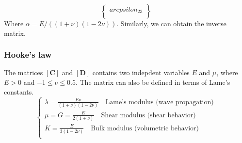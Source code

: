 \documentclass[notes]{beamer}
\begin{document}
\begin{frame}
\begin{equation*}
\begin{Bmatrix}
arepsilon_{23}\\
	\end{Bmatrix}
\end{equation*}
Where $\alpha = E / ((1+\nu)(1-2\nu))$.
Similarly, we can obtain the inverse matrix.
\end{frame}


\begin{frame}
\frametitle{Hooke's law}
The matrices $[\mathbf{C}]$ and $[\mathbf{D}]$ contains two indepdent variables $E$ and $\mu$, where $E > 0$ and $-1 \le \nu \le 0.5$. 
The matrix can also be defined in terms of Lame's constants.
\begin{equation*}
	\begin{cases}
		\lambda = \frac{E \nu}{(1+\nu)(1-2\nu)} \quad \text{Lame's modulus (wave propagation)}\\
		\mu = G = \frac{E}{2(1+\nu)}
		\quad \text{Shear modulus (shear behavior)}\\
		K = \frac{E}{3(1-2\nu)}
		\quad \text{Bulk modulus (volumetric behavior)}\\
	\end{cases}
\end{equation*}
\end{frame}
\end{document}
